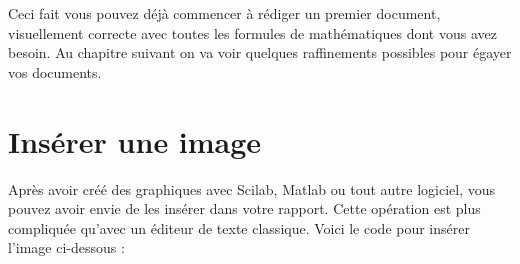 Ceci fait vous pouvez déjà commencer à rédiger un premier document, visuellement correcte avec
 toutes les formules de mathématiques dont vous avez besoin. Au chapitre suivant on va voir 
quelques raffinements possibles pour égayer vos documents.



\section{Insérer une image }

Après avoir créé des graphiques avec Scilab, Matlab ou tout autre logiciel,  vous pouvez avoir 
envie de les insérer dans votre rapport. Cette opération est plus compliquée qu'avec un éditeur 
de texte classique. Voici le code pour insérer l'image ci-dessous : \medskip

